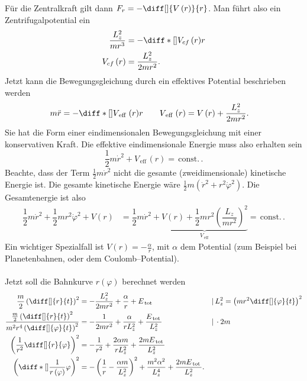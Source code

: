 \documentclass[a4paper,12pt]{article}
\numberwithin{equation}{section}
\begin{document}
Für die Zentralkraft gilt dann $F_r=-\diff[]{V\left(r\right)}{r}$. Man führt also ein \glqq Zentrifugalpotential\grqq{} ein
\begin{align*}
        \dfrac{L_z^2}{mr^3}&=-\diff*[]{V_{cf}\left(r\right)}{r}\\
        V_{cf}\left(r\right)&=\dfrac{L_z^2}{2mr^2}
.\end{align*}
Jetzt kann die Bewegungsgleichung durch ein \glqq effektives Potential\grqq{} beschrieben werden
\begin{align*}
        m\ddot{r}&=-\diff*[]{V_{\,\text{eff}\,}\left(r\right)}{r}\qquad V_{\,\text{eff}\,}\left(r\right)=V\left(r\right)+\dfrac{L_z^2}{2mr^2}
.\end{align*}
Sie hat die Form einer eindimensionalen Bewegungsgleichung mit einer konservativen Kraft. Die effektive eindimensionale Energie muss also erhalten sein
\[ 
        \dfrac{1}{2}m\dot{r}^2+V_{\,\text{eff}\,}\left(r\right)=\,\text{const.}\,
.\] 
Beachte, dass der Term $\tfrac{1}{2}m\dot{r}^2$ nicht die gesamte (zweidimensionale) kinetische Energie ist. Die gesamte kinetische Energie wäre $\tfrac{1}{2}m\left(\dot{r}^2+r^2\dot{\varphi }^2\right)$. Die Gesamtenergie ist also
\begin{align*}
        \dfrac{1}{2}m\dot{r}^2+\dfrac{1}{2}mr^2\dot{\varphi }^2+V\left(r\right)&=\dfrac{1}{2}m\dot{r}^2+\underbrace{V\left(r\right)+\dfrac{1}{2}mr^2\left(\dfrac{L_z}{mr^2}\right)^2}_{V_{\,\text{eff}\,}}=\,\text{const.}\,
.\end{align*}
Ein wichtiger Spezialfall ist $V\left(r\right)=-\tfrac{\alpha }{r}$, mit $\alpha $ dem Potential (zum Beispiel bei Planetenbahnen, oder dem Coulomb--Potential).\\\\\indent
Jetzt soll die Bahnkurve $r\left(\varphi \right)$ berechnet werden
\begin{align*}
        \dfrac{m}{2}\left(\diff[]{r}{t}\right)^2&=-\dfrac{L_z^2}{2mr^2}+\dfrac{\alpha }{r}+E_{\,\text{tot}\,}&&|\,L_z^2=\left(mr^2\diff[]{\varphi }{t}\right)^2\\
        \dfrac{\tfrac{m}{2}\left(\diff[]{r}{t}\right)^2}{m^2r^4\left(\diff[]{\varphi }{t}\right)^2}&=-\dfrac{1}{2mr^2}+\dfrac{\alpha }{rL_z^2}+\dfrac{E_{\,\text{tot}\,}}{L_z^2}&&|\,\cdot 2m\\
        \left(\dfrac{1}{r^2}\diff[]{r}{\varphi }\right)^2&=-\dfrac{1}{r^2}+\dfrac{2\alpha m}{rL_z^2}+\dfrac{2mE_{\,\text{tot}\,}}{L_z^2}\\
        \left(\diff*[]{\dfrac{1}{r\left(\varphi \right)}}{\varphi }\right)^2&=-\left(\dfrac{1}{r}-\dfrac{\alpha m}{L_z^2}\right)^2+\dfrac{m^2\alpha ^2}{L_z^4}+\dfrac{2mE_{\,\text{tot}\,}}{L_z^2}
.\end{align*}
\end{document}
